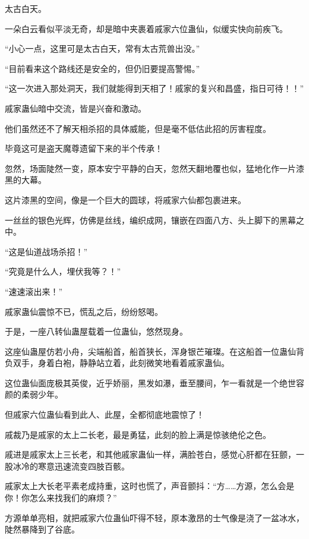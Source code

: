 
\begin{this_body}

太古白天。

一朵白云看似平淡无奇，却是暗中夹裹着戚家六位蛊仙，似缓实快向前疾飞。

“小心一点，这里可是太古白天，常有太古荒兽出没。”

“目前看来这个路线还是安全的，但仍旧要提高警惕。”

“这一次进入那处洞天，我们就能得到天相了！戚家的复兴和昌盛，指日可待！！”

戚家蛊仙暗中交流，皆是兴奋和激动。

他们虽然还不了解天相杀招的具体威能，但是毫不低估此招的厉害程度。

毕竟这可是盗天魔尊遗留下来的半个传承！

忽然，场面陡然一变，原本安宁平静的白天，忽然天翻地覆也似，猛地化作一片漆黑的大幕。

这片漆黑的空间，像是一个巨大的圆球，将戚家六仙都包裹进来。

一丝丝的银色光辉，仿佛是丝线，编织成网，镶嵌在四面八方、头上脚下的黑幕之中。

“这是仙道战场杀招！”

“究竟是什么人，埋伏我等？！”

“速速滚出来！”

戚家蛊仙震惊不已，慌乱之后，纷纷怒喝。

于是，一座八转仙蛊屋载着一位蛊仙，悠然现身。

这座仙蛊屋仿若小舟，尖端船首，船首狭长，浑身银芒璀璨。在这船首一位蛊仙背负双手，身着白袍，静静站立着，此刻微笑地看着戚家蛊仙。

这位蛊仙面庞极其英俊，近乎娇丽，黑发如瀑，垂至腰间，乍一看就是一个绝世容颜的柔弱少年。

但戚家六位蛊仙看到此人、此屋，全都彻底地震惊了！

戚裁乃是戚家的太上二长老，最是勇猛，此刻的脸上满是惊骇绝伦之色。

戚进是戚家太上三长老，和其他戚家蛊仙一样，满脸苍白，感觉心肝都在狂颤，一股冰冷的寒意迅速流变四肢百骸。

戚家太上大长老平素老成持重，这时也慌了，声音颤抖：“方……方源，怎么会是你！你怎么来找我们的麻烦？”

方源单单亮相，就把戚家六位蛊仙吓得不轻，原本激昂的士气像是浇了一盆冰水，陡然暴降到了谷底。


\end{this_body}
